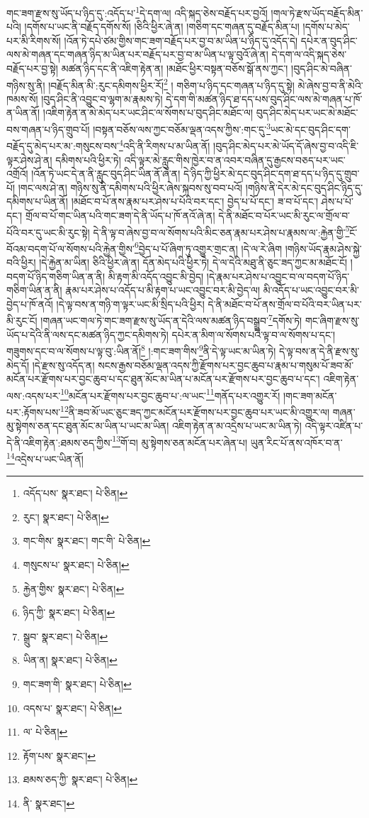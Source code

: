 གང་ཟག་རྫས་སུ་ཡོད་པ་ཉིད་དུ་:འདོད་པ་\footnote{འདོད་པས་  སྣར་ཐང་།  པེ་ཅིན། }དེ་དག་ལ། འདི་སྐད་ཅེས་བརྗོད་པར་བྱའོ། །གལ་ཏེ་རྫས་ཡོད་བརྗོད་མིན་པའི། །དགོས་པ་ཡང་ནི་བརྗོད་དགོས་སོ། །ཅིའི་ཕྱིར་ཞེ་ན། །གཅིག་དང་གཞན་དུ་བརྗོད་མིན་པ། །དགོས་པ་མེད་པར་མི་རིགས་སོ། །འོན་ཏེ་དཔེ་ཙམ་གྱིས་གང་ཟག་བརྗོད་པར་བྱ་བ་མ་ཡིན་པ་ཉིད་དུ་འདོད་དེ། དཔེར་ན་བུད་ཤིང་ལས་མེ་གཞན་དང་གཞན་ཉིད་མ་ཡིན་པར་བརྗོད་པར་བྱ་བ་མ་ཡིན་པ་ལྟ་བུའོ་ཞེ་ན། དེ་དག་ལ་འདི་སྐད་ཅེས་བརྗོད་པར་བྱ་སྟེ། མཚན་ཉིད་དང་ནི་འཇིག་རྟེན་ན། །མཐོང་ཕྱིར་བསྟན་བཅོས་སྒོ་ནས་ཀྱང་། །བུད་ཤིང་མེ་བཞིན་གཉིས་སུ་ནི། །བརྗོད་མིན་མི་:རུང་དམིགས་ཕྱིར་རོ།\footnote{རུང་།  སྣར་ཐང་།  པེ་ཅིན། } །
གཅིག་པ་ཉིད་དང་གཞན་པ་ཉིད་དུ་སྟེ། མེ་ཞེས་བྱ་བ་ནི་མེའི་ཁམས་སོ། །བུད་ཤིང་ནི་འབྱུང་བ་ལྷག་མ་རྣམས་ཏེ། དེ་དག་གི་མཚན་ཉིད་ཐ་དད་པས་བུད་ཤིང་ལས་མེ་གཞན་པ་ཁོ་ན་ཡིན་ནོ། །འཇིག་རྟེན་ན་མེ་མེད་པར་ཡང་ཤིང་ལ་སོགས་པ་བུད་ཤིང་མཐོང་ལ། བུད་ཤིང་མེད་པར་ཡང་མེ་མཐོང་བས་གཞན་པ་ཉིད་གྲུབ་པོ། །བསྟན་བཅོས་ལས་ཀྱང་བཅོམ་ལྡན་འདས་ཀྱིས་:གང་དུ་\footnote{གང་གིས་  སྣར་ཐང་། གང་གི་  པེ་ཅིན། }ཡང་མེ་དང་བུད་ཤིང་དག་བརྗོད་དུ་མེད་པར་མ་:གསུངས་བས་\footnote{གསུངས་པ་  སྣར་ཐང་།  པེ་ཅིན། }འདི་ནི་རིགས་པ་མ་ཡིན་ནོ། །བུད་ཤིང་མེད་པར་མེ་ཡོད་དོ་ཞེས་བྱ་བ་འདི་ཇི་ལྟར་ཤེས་ཤེ་ན། དམིགས་པའི་ཕྱིར་ཏེ། འདི་ལྟར་མེ་རླུང་གིས་ཁྱེར་བ་ན་འབར་བཞིན་དུ་རྒྱངས་བཅད་པར་ཡང་འགྲོའོ། །འོན་ཏེ་ཡང་དེ་ན་ནི་རླུང་བུད་ཤིང་ཡིན་ནོ་ཞེ་ན། དེ་ཉིད་ཀྱི་ཕྱིར་མེ་དང་བུད་ཤིང་དག་ཐ་དད་པ་ཉིད་དུ་གྲུབ་པོ། །གང་ལས་ཤེ་ན། གཉིས་སུ་ནི་དམིགས་པའི་ཕྱིར་ཞེས་སྐབས་སུ་བབ་པའོ། །གཉིས་ནི་དེར་མེ་དང་བུད་ཤིང་ཉིད་དུ་དམིགས་པ་ཡིན་ནོ། །མཐོང་བ་པོ་ནས་རྣམ་པར་ཤེས་པ་པོའི་བར་དང་། བྱེད་པ་པོ་དང་། ཟ་བ་པོ་དང་། ཤེས་པ་པོ་དང་། གྲོལ་བ་པོ་གང་ཡིན་པའི་གང་ཟག་དེ་ནི་ཡོད་པ་ཁོ་ནའོ་ཞེ་ན། དེ་ནི་མཐོང་བ་པོར་ཡང་མི་རུང་ལ་གྲོལ་བ་པོའི་བར་དུ་ཡང་མི་རུང་སྟེ། དེ་ནི་ལྟ་བ་ཞེས་བྱ་བ་ལ་སོགས་པའི་མིང་ཅན་རྣམ་པར་ཤེས་པ་རྣམས་ལ་:རྐྱེན་གྱི་\footnote{རྐྱེན་གྱིས་  སྣར་ཐང་།  པེ་ཅིན། }ངོ་བོའམ་བདག་པོ་ལ་སོགས་པའི་རྐྱེན་གྱིས་\footnote{ཉིད་ཀྱི་  སྣར་ཐང་།  པེ་ཅིན། }བྱེད་པ་པོ་ཞིག་ཏུ་འགྱུར་གྲང་ན། །དེ་ལ་རེ་ཞིག །གཉིས་ཡོད་རྣམ་ཤེས་སྐྱེ་བའི་ཕྱིར། །དེ་རྐྱེན་མ་ཡིན། ཅིའི་ཕྱིར་ཞེ་ན། དོན་མེད་པའི་ཕྱིར་ཏེ། དེ་ལ་དེའི་མཐུ་ནི་ཅུང་ཟད་ཀྱང་མ་མཐོང་ངོ། །བདག་པོ་ཉིད་གཅིག་ཡིན་ན་ནི། མི་རྟག་མི་འདོད་འབྱུང་མི་བྱེད། །དེ་རྣམ་པར་ཤེས་པ་འབྱུང་བ་ལ་བདག་པོ་ཉིད་གཅིག་ཡིན་ན་ནི། རྣམ་པར་ཤེས་པ་འདོད་པ་མི་རྟག་པ་ཡང་འབྱུང་བར་མི་བྱེད་ལ། མི་འདོད་པ་ཡང་འབྱུང་བར་མི་བྱེད་པ་ཁོ་ནའོ། །དེ་ལྟ་བས་ན་གཉི་ག་ལྟར་ཡང་མི་སྲིད་པའི་ཕྱིར། དེ་ནི་མཐོང་བ་པོ་ནས་གྲོལ་བ་པོའི་བར་ཡིན་པར་མི་རུང་ངོ། །གཞན་ཡང་གལ་ཏེ་གང་ཟག་རྫས་སུ་ཡོད་ན་དེའི་ལས་མཚན་ཉིད་བསྒྲུབ་\footnote{སྒྲུབ་  སྣར་ཐང་།  པེ་ཅིན། }དགོས་ཏེ། གང་ཞིག་རྫས་སུ་ཡོད་པ་དེའི་ནི་ལས་དང་མཚན་ཉིད་ཀྱང་དམིགས་ཏེ། དཔེར་ན་མིག་ལ་སོགས་པའི་ལྟ་བ་ལ་སོགས་པ་དང་། གཟུགས་དང་བ་ལ་སོགས་པ་ལྟ་བུ་:ཡིན་ནོ།\footnote{ཡིན་ན།  སྣར་ཐང་།  པེ་ཅིན། } །:གང་ཟག་གིས་\footnote{གང་ཟག་གི་  སྣར་ཐང་།  པེ་ཅིན། }ནི་དེ་ལྟ་ཡང་མ་ཡིན་ཏེ། དེ་ལྟ་བས་ན་དེ་ནི་རྫས་སུ་མེད་དོ། །དེ་རྫས་སུ་འདོད་ན། སངས་རྒྱས་བཅོམ་ལྡན་འདས་ཀྱི་རྫོགས་པར་བྱང་ཆུབ་པ་རྣམ་པ་གསུམ་པོ་ཟབ་མོ་མངོན་པར་རྫོགས་པར་བྱང་ཆུབ་པ་དང་ཐུན་མོང་མ་ཡིན་པ་མངོན་པར་རྫོགས་པར་བྱང་ཆུབ་པ་དང་། འཇིག་རྟེན་ལས་:འདས་པར་\footnote{འདས་པ་  སྣར་ཐང་།  པེ་ཅིན། }མངོན་པར་རྫོགས་པར་བྱང་ཆུབ་པ་:ལ་ཡང་\footnote{ལ་  པེ་ཅིན། }གནོད་པར་འགྱུར་རོ། །གང་ཟག་མངོན་པར་:རྟོགས་པས་\footnote{རྟོག་པས་  སྣར་ཐང་། }ནི་ཟབ་མོ་ཡང་ཅུང་ཟད་ཀྱང་མངོན་པར་རྫོགས་པར་བྱང་ཆུབ་པར་ཡང་མི་འགྱུར་ལ། གཞན་མུ་སྟེགས་ཅན་དང་ཐུན་མོང་མ་ཡིན་པ་ཡང་མ་ཡིན། འཇིག་རྟེན་ན་མ་འདྲེས་པ་ཡང་མ་ཡིན་ཏེ། འདི་ལྟར་འཛིན་པ་དེ་ནི་འཇིག་རྟེན་:ཐམས་ཅད་ཀྱིས་\footnote{ཐམས་ཅད་ཀྱི་  སྣར་ཐང་།  པེ་ཅིན། }གོ་བ། མུ་སྟེགས་ཅན་མངོན་པར་ཞེན་པ། ཡུན་རིང་པོ་ནས་འཁོར་བ་ན་\footnote{ནི་  སྣར་ཐང་། }འདྲེས་པ་ཡང་ཡིན་ནོ། 